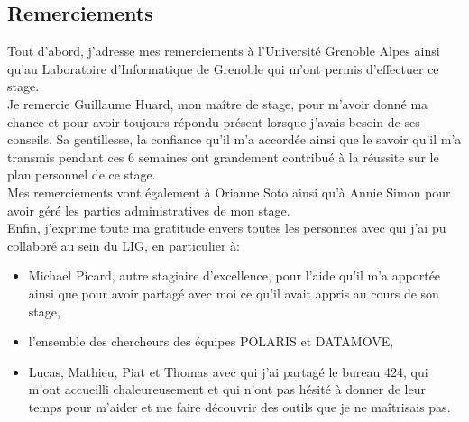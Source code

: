 \documentclass[a4paper,12pt]{report}
\begin{document}
\begin{onehalfspace}

\chapter*{Remerciements}

Tout d'abord, j'adresse mes remerciements à l'Université Grenoble Alpes ainsi qu'au Laboratoire d'Informatique de Grenoble qui m'ont permis d'effectuer ce stage.\\

Je remercie Guillaume Huard, mon maître de stage, pour m'avoir donné ma chance et pour avoir toujours répondu présent lorsque j'avais besoin de ses conseils. Sa gentillesse, la confiance qu'il m'a accordée ainsi que le savoir qu'il m'a transmis pendant ces 6 semaines ont grandement contribué à la réussite sur le plan personnel de ce stage.\\

Mes remerciements vont également à Orianne Soto ainsi qu'à Annie Simon pour avoir géré les parties administratives de mon stage.\\

Enfin, j'exprime toute ma gratitude envers toutes les personnes avec qui j'ai pu collaboré au sein du LIG, en particulier à:
\begin{itemize}[label=\textbullet]
\item Michael Picard, autre stagiaire d'excellence, pour l'aide qu'il m'a apportée ainsi que pour avoir partagé avec moi ce qu'il avait appris au cours de son stage,
\item l'ensemble des chercheurs des équipes POLARIS et DATAMOVE,
\item Lucas, Mathieu, Piat et Thomas avec qui j'ai partagé le bureau 424, qui m'ont accueilli chaleureusement et qui n'ont pas hésité à donner de leur temps pour m'aider et me faire découvrir des outils que je ne maîtrisais pas.
\end{itemize} 

\renewcommand\contentsname{\bf\hfill Table des matières \hfill}
\tableofcontents

\pagestyle{fancy}

	

    



\end{onehalfspace}



\end{document}

